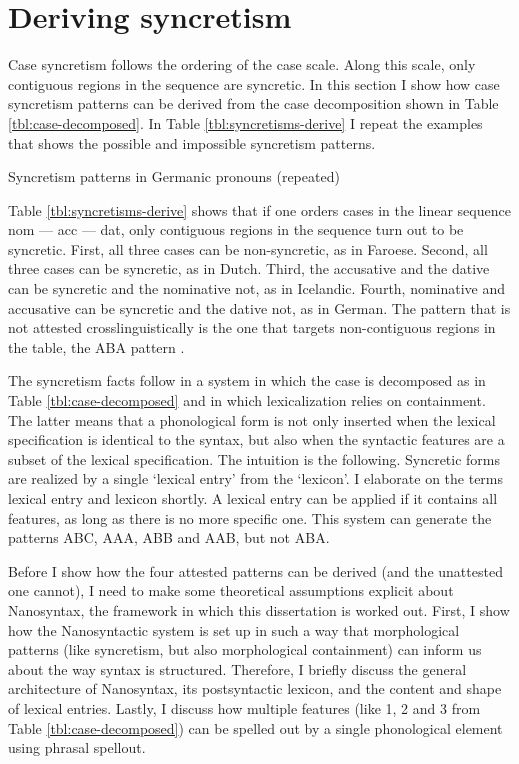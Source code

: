 \section{Deriving syncretism}\label{sec:syncretism}

Case syncretism follows the ordering of the case scale. Along this scale, only contiguous regions in the sequence are syncretic. In this section I show how case syncretism patterns can be derived from the case decomposition shown in Table \ref{tbl:case-decomposed}.
In Table \ref{tbl:syncretisms-derive} I repeat the examples that shows the possible and impossible syncretism patterns.

\begin{table}[ht]
  \center
  \caption {Syncretism patterns in Germanic pronouns (repeated)}
    
  \label{tbl:syncretisms-derive}
\end{table}

Table \ref{tbl:syncretisms-derive} shows that if one orders cases in the linear sequence \ac{nom} --- \ac{acc} --- \ac{dat}, only contiguous regions in the sequence turn out to be syncretic. First, all three cases can be non-syncretic, as in Faroese. Second, all three cases can be syncretic, as in Dutch. Third, the accusative and the dative can be syncretic and the nominative not, as in Icelandic. Fourth, nominative and accusative can be syncretic and the dative not, as in German. The pattern that is not attested crosslinguistically is the one that targets non-contiguous regions in the table, the ABA pattern \citep{baerman2005,caha2009,zompi2017}.

The syncretism facts follow in a system in which the case is decomposed as in Table \ref{tbl:case-decomposed} and in which lexicalization relies on containment. The latter means that a phonological form is not only inserted when the lexical specification is identical to the syntax, but also when the syntactic features are a subset of the lexical specification. The intuition is the following. Syncretic forms are realized by a single `lexical entry' from the `lexicon'. I elaborate on the terms lexical entry and lexicon shortly.
A lexical entry can be applied if it contains all features, as long as there is no more specific one. This system can generate the patterns ABC, AAA, ABB and AAB, but not ABA.

Before I show how the four attested patterns can be derived (and the unattested one cannot), I need to make some theoretical assumptions explicit about Nanosyntax, the framework in which this dissertation is worked out. First, I show how the Nanosyntactic system is set up in such a way that morphological patterns (like syncretism, but also morphological containment) can inform us about the way syntax is structured. Therefore, I briefly discuss the general architecture of Nanosyntax, its postsyntactic lexicon, and the content and shape of lexical entries. Lastly, I discuss how multiple features (like 1, 2 and 3 from Table \ref{tbl:case-decomposed}) can be spelled out by a single phonological element using phrasal spellout.

